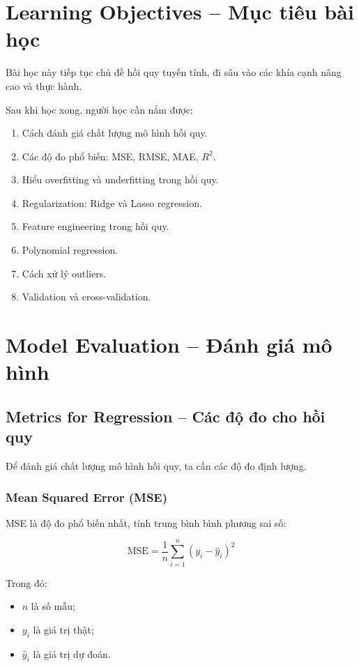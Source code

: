 \section*{Learning Objectives -- Mục tiêu bài học}

Bài học này tiếp tục chủ đề hồi quy tuyến tính, đi sâu vào các khía cạnh nâng cao và thực hành.

Sau khi học xong, người học cần nắm được:

\begin{enumerate}[label=\arabic*.]
    \item Cách đánh giá chất lượng mô hình hồi quy.
    \item Các độ đo phổ biến: MSE, RMSE, MAE, $R^2$.
    \item Hiểu overfitting và underfitting trong hồi quy.
    \item Regularization: Ridge và Lasso regression.
    \item Feature engineering trong hồi quy.
    \item Polynomial regression.
    \item Cách xử lý outliers.
    \item Validation và cross-validation.
\end{enumerate}

\section{Model Evaluation -- Đánh giá mô hình}

\subsection{Metrics for Regression -- Các độ đo cho hồi quy}

Để đánh giá chất lượng mô hình hồi quy, ta cần các độ đo định lượng.

\subsubsection{Mean Squared Error (MSE)}

MSE là độ đo phổ biến nhất, tính trung bình bình phương sai số:

\[
    \text{MSE} = \frac{1}{n}\sum_{i=1}^{n}(y_i - \hat{y}_i)^2
\]

Trong đó:
\begin{itemize}
    \item $n$ là số mẫu;
    \item $y_i$ là giá trị thật;
    \item $\hat{y}_i$ là giá trị dự đoán.
\end{itemize}

